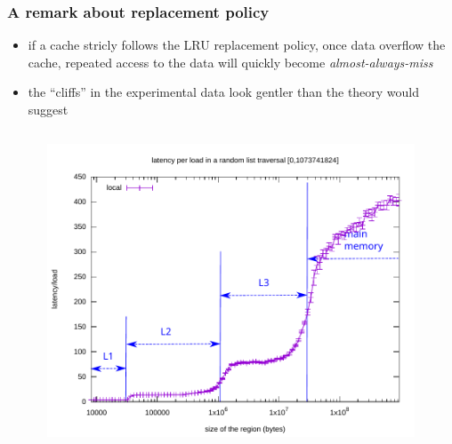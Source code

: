 \documentclass[12pt,dvipdfmx]{beamer}
\newcommand{\ao}[1]{{\color{blue}#1}}
\begin{document}
\begin{frame}
\frametitle{A remark about replacement policy}
\begin{itemize}
\item if a cache stricly follows the LRU replacement policy, 
  once data overflow the cache, repeated access to the data
  will quickly become \ao{\emph{almost-always-miss}}

\item the ``cliffs'' in the experimental data
  look gentler than the theory would suggest

\begin{columns}
  \begin{column}{0.5\textwidth}
\def\svgwidth{\textwidth}
\only<1>{\tiny}%
\only<2>{\tiny}%
  \end{column}  
  \begin{column}{0.5\textwidth}
\includegraphics[width=0.9\textwidth]{out/pdf/svg/latency_cliff.pdf}
  \end{column}
\end{columns}
\end{itemize}
\end{frame}
\end{document}
